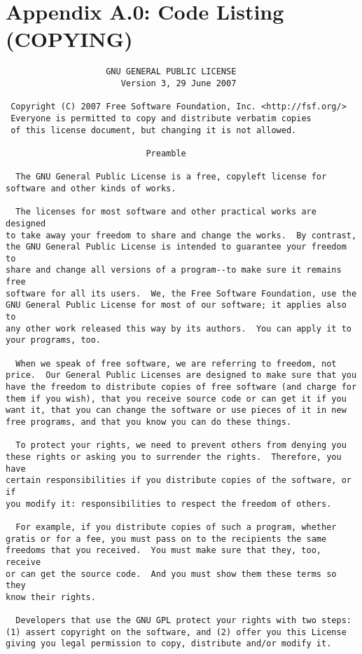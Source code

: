\documentclass{article}
\begin{document}
\section{Appendix A.0: Code Listing (COPYING)}
\footnotesize
\begin{verbatim}
                    GNU GENERAL PUBLIC LICENSE
                       Version 3, 29 June 2007

 Copyright (C) 2007 Free Software Foundation, Inc. <http://fsf.org/>
 Everyone is permitted to copy and distribute verbatim copies
 of this license document, but changing it is not allowed.

                            Preamble

  The GNU General Public License is a free, copyleft license for
software and other kinds of works.

  The licenses for most software and other practical works are designed
to take away your freedom to share and change the works.  By contrast,
the GNU General Public License is intended to guarantee your freedom to
share and change all versions of a program--to make sure it remains free
software for all its users.  We, the Free Software Foundation, use the
GNU General Public License for most of our software; it applies also to
any other work released this way by its authors.  You can apply it to
your programs, too.

  When we speak of free software, we are referring to freedom, not
price.  Our General Public Licenses are designed to make sure that you
have the freedom to distribute copies of free software (and charge for
them if you wish), that you receive source code or can get it if you
want it, that you can change the software or use pieces of it in new
free programs, and that you know you can do these things.

  To protect your rights, we need to prevent others from denying you
these rights or asking you to surrender the rights.  Therefore, you have
certain responsibilities if you distribute copies of the software, or if
you modify it: responsibilities to respect the freedom of others.

  For example, if you distribute copies of such a program, whether
gratis or for a fee, you must pass on to the recipients the same
freedoms that you received.  You must make sure that they, too, receive
or can get the source code.  And you must show them these terms so they
know their rights.

  Developers that use the GNU GPL protect your rights with two steps:
(1) assert copyright on the software, and (2) offer you this License
giving you legal permission to copy, distribute and/or modify it.


\end{verbatim}
\end{document}
